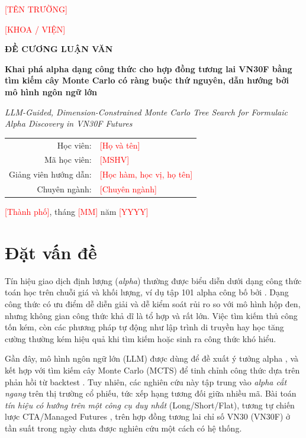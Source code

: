 \documentclass[12pt,a4paper]{article}
\newcommand{\TODO}[1]{\textcolor{red}{[#1]}}
\begin{document}
\begin{titlepage}
\centering
{\large \TODO{TÊN TRƯỜNG}\par}
{\large \TODO{KHOA / VIỆN}\par}
\vspace{3cm}
{\Large\bfseries ĐỀ CƯƠNG LUẬN VĂN\par}
\vspace{1.2cm}
{\LARGE\bfseries Khai phá alpha dạng công thức cho hợp đồng tương lai VN30F bằng tìm kiếm cây Monte Carlo có ràng buộc thứ nguyên, dẫn hướng bởi mô hình ngôn ngữ lớn\par}
\vspace{0.8cm}
{\large\itshape LLM-Guided, Dimension-Constrained Monte Carlo Tree Search for Formulaic Alpha Discovery in VN30F Futures\par}
\vfill
\begin{tabular}{rl}
Học viên: & \TODO{Họ và tên} \\
Mã học viên: & \TODO{MSHV} \\
Giảng viên hướng dẫn: & \TODO{Học hàm, học vị, họ tên} \\
Chuyên ngành: & \TODO{Chuyên ngành} \\
\end{tabular}
\vspace{2cm}

{\TODO{Thành phố}, tháng \TODO{MM} năm \TODO{YYYY}\par}
\end{titlepage}

\tableofcontents
\newpage

\section{Đặt vấn đề}

Tín hiệu giao dịch định lượng (\emph{alpha}) thường được biểu diễn dưới dạng công thức toán học trên chuỗi giá và khối lượng, ví dụ tập 101 alpha công bố bởi \citet{kakushadze2016alphas}. Dạng công thức có ưu điểm dễ diễn giải và dễ kiểm soát rủi ro so với mô hình hộp đen, nhưng không gian công thức khả dĩ là tổ hợp và rất lớn. Việc tìm kiếm thủ công tốn kém, còn các phương pháp tự động như lập trình di truyền \citep{koza1992gp} hay học tăng cường \citep{yu2023alphagen} thường kém hiệu quả khi tìm kiếm hoặc sinh ra công thức khó hiểu.

Gần đây, mô hình ngôn ngữ lớn (LLM) được dùng để đề xuất ý tưởng alpha \citep{wang2023alphagpt,tang2025alphaagent}, và kết hợp với tìm kiếm cây Monte Carlo (MCTS) để tinh chỉnh công thức dựa trên phản hồi từ backtest \citep{shi2026alphajungle}. Tuy nhiên, các nghiên cứu này tập trung vào \emph{alpha cắt ngang} trên thị trường cổ phiếu, tức xếp hạng tương đối giữa nhiều mã. Bài toán \emph{tín hiệu có hướng trên một công cụ duy nhất} (Long/Short/Flat), tương tự chiến lược CTA/Managed Futures \citep{moskowitz2012tsmom}, trên hợp đồng tương lai chỉ số VN30 (VN30F) ở tần suất trong ngày chưa được nghiên cứu một cách có hệ thống.
\end{document}
